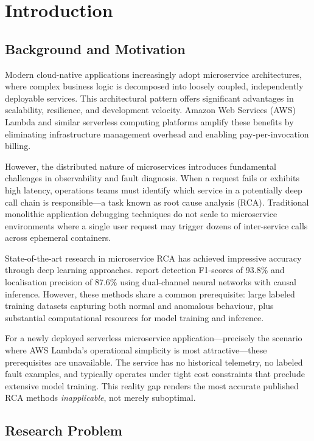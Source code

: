 \chapter{Introduction}

\section{Background and Motivation}

Modern cloud-native applications increasingly adopt microservice architectures, where complex business logic is decomposed into loosely coupled, independently deployable services. This architectural pattern offers significant advantages in scalability, resilience, and development velocity. Amazon Web Services (AWS) Lambda and similar serverless computing platforms amplify these benefits by eliminating infrastructure management overhead and enabling pay-per-invocation billing.

However, the distributed nature of microservices introduces fundamental challenges in observability and fault diagnosis. When a request fails or exhibits high latency, operations teams must identify which service in a potentially deep call chain is responsible—a task known as root cause analysis (RCA). Traditional monolithic application debugging techniques do not scale to microservice environments where a single user request may trigger dozens of inter-service calls across ephemeral containers.

State-of-the-art research in microservice RCA has achieved impressive accuracy through deep learning approaches. \citet{xing2025dualchannel} report detection F1-scores of 93.8\% and localisation precision of 87.6\% using dual-channel neural networks with causal inference. However, these methods share a common prerequisite: large labeled training datasets capturing both normal and anomalous behaviour, plus substantial computational resources for model training and inference.

For a newly deployed serverless microservice application—precisely the scenario where AWS Lambda's operational simplicity is most attractive—these prerequisites are unavailable. The service has no historical telemetry, no labeled fault examples, and typically operates under tight cost constraints that preclude extensive model training. This reality gap renders the most accurate published RCA methods \textit{inapplicable}, not merely suboptimal.

\section{Research Problem}

